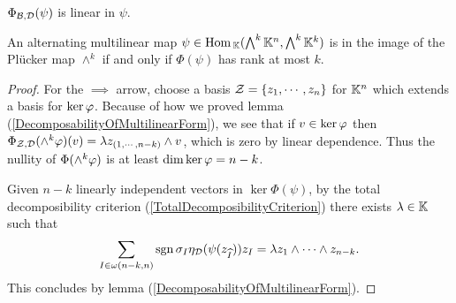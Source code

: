 \begin{remark}
$\Phi_{\mathcal{B},\mathcal{D}}(\psi)$ is linear in $\psi$.
\end{remark}

\begin{proposition}\label{RankCriterionForImageOfPlucker}
An alternating multilinear map $\psi\in \mathrm{Hom}\,_{\mathbb{K}}(\bigwedge^k\mathbb{K}^n,\bigwedge^k\mathbb{K}^k)$ is in the image of the Pl\"ucker map $\wedge^k$ if and only if $\Phi(\psi)$ has rank at most $k$.
\end{proposition}
\begin{proof}
For the $\implies$ arrow, choose a basis $\mathcal{Z}=\left\{{z_1,\cdots, z_n}\right\}$ for $\mathbb{K}^n$ which extends a basis for $\ker\varphi$. Because of how we proved lemma (\ref{DecomposabilityOfMultilinearForm}), we see that if $v\in\ker\varphi$ then $\Phi_{\mathcal{Z},\mathcal{D}}(\wedge^k\varphi)(v)=\lambda z_{(1,\cdots, n-k)}\wedge v$, which is zero by linear dependence. Thus the nullity of $\Phi(\wedge^k\varphi)$ is at least $\dim\ker\varphi=n-k$.\bigskip

Given $n-k$ linearly independent vectors in $\ker\Phi(\psi)$, by the total decomposibility criterion (\ref{TotalDecomposibilityCriterion}) there exists $\lambda\in\mathbb{K}$ such that
\[\sum_{I\in \omega(n-k,n)}\mathrm{sgn}\,\sigma_I\eta_{\mathcal{D}}(\psi(z_{\widehat{I}}))z_I=\lambda z_1\wedge\cdots \wedge z_{n-k}.\]
This concludes by lemma (\ref{DecomposabilityOfMultilinearForm}).
\end{proof}

